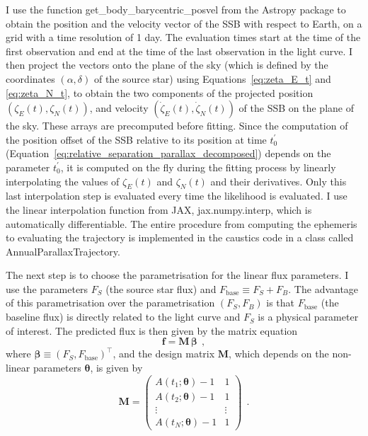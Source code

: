 \documentclass[12pt,dvipsnames]{report}
\newcommand{\ssf}[1]{\textsf{#1}}
\renewcommand{\vec}[1]{\boldsymbol{\mathbf{#1}}}
\newcommand{\hquad}{~~}
\begin{document}
I use the function \ssf{get\_body\_barycentric\_posvel} from the \ssf{Astropy} package to obtain the 
position and the velocity vector of the SSB with respect to Earth, 
on a grid with a time resolution of 1 day.
The evaluation times start at the time of the first observation and end at the time of the
last observation in the light curve. I then project the vectors onto the plane of 
the sky (which is defined by the coordinates $(\alpha, \delta)$ of the source star) 
using Equations~\ref{eq:zeta_E_t} and \ref{eq:zeta_N_t}, to obtain the two components 
of the projected position $(\zeta_E(t), \zeta_N(t))$, and velocity 
$(\dot\zeta_E(t), \dot\zeta_N(t))$ of the SSB on the plane of the sky. These arrays 
are precomputed before fitting. Since the computation of the position offset of the SSB 
relative to its position at time $t_0^\prime$ 
(Equation~\ref{eq:relative_separation_parallax_decomposed}) depends on the parameter
$t_0^\prime$, it is computed on the fly during the fitting process by linearly
interpolating the values of $\zeta_E(t)$ and $\zeta_N(t)$ and their derivatives. 
Only this last interpolation step is evaluated every time the likelihood is evaluated.
I use the linear interpolation function from \ssf{JAX}, \ssf{jax.numpy.interp},
which is automatically differentiable.
The entire procedure from computing the ephemeris to evaluating the trajectory is implemented 
in the \ssf{caustics} code in a class called \ssf{AnnualParallaxTrajectory}.

The next step is to choose the parametrisation for the linear flux parameters.
I use the parameters $F_S$ (the source star flux) and 
$F_\mathrm{base}\equiv F_S + F_B$. 
The advantage of this parametrisation over the parametrisation $(F_S,F_B)$ is that 
$F_\mathrm{base}$ (the baseline flux) is directly related to the light curve and  
$F_S$ is a physical parameter of interest. 
The predicted flux is then given by the matrix equation
\begin{equation}
    \vec f =\vec M \,\vec \beta 
    \hquad,
    \label{eq:flux_microlensing}
\end{equation}
where $\vec \beta \equiv (F_S, F_\mathrm{base})^\intercal$, and 
the design matrix $\vec M$, which depends on the non-linear parameters $\vec\theta$, 
is given by
\begin{equation}
    \vec M = \begin{pmatrix} 
        A(t_1;\vec\theta) - 1 & 1 \\ 
        A(t_2;\vec\theta) - 1& 1 \\ 
        \vdots & \vdots \\ 
        A(t_N;\vec\theta) - 1 & 1
    \end{pmatrix}
    \hquad .
\end{equation}
\end{document}
